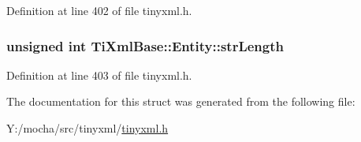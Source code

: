 Definition at line 402 of file tinyxml.h.

\hypertarget{struct_ti_xml_base_1_1_entity_a22e8d820894d3360b01fed110badb876}{
\subsubsection[{strLength}]{\setlength{\rightskip}{0pt plus 5cm}unsigned int {\bf TiXmlBase::Entity::strLength}}}
\label{struct_ti_xml_base_1_1_entity_a22e8d820894d3360b01fed110badb876}


Definition at line 403 of file tinyxml.h.



The documentation for this struct was generated from the following file:\begin{DoxyCompactItemize}
\item 
Y:/mocha/src/tinyxml/\hyperlink{tinyxml_8h}{tinyxml.h}\end{DoxyCompactItemize}
